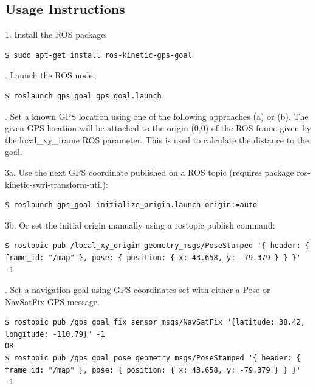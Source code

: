 \documentclass[runningheads,a4paper]{llncs}
\begin{document}
\subsection{Usage Instructions}

1. Install the ROS package:

\begin{lstlisting}[frame=single,basicstyle=\ttfamily\footnotesize,breaklines=true]
$ sudo apt-get install ros-kinetic-gps-goal
\end{lstlisting}

. Launch the ROS node:

\begin{lstlisting}[frame=single,basicstyle=\ttfamily\footnotesize,breaklines=true]
$ roslaunch gps_goal gps_goal.launch
\end{lstlisting}


. Set a known GPS location using one of the following approaches (a) or (b). The given GPS location will be attached to the origin (0,0) of the ROS frame given by the local\_xy\_frame ROS parameter. This is used to calculate the distance to the goal.

3a. Use the next GPS coordinate published on a ROS topic (requires package ros-kinetic-swri-transform-util):

\begin{lstlisting}[frame=single,basicstyle=\ttfamily\footnotesize,breaklines=true]
$ roslaunch gps_goal initialize_origin.launch origin:=auto
\end{lstlisting}

3b. Or set the initial origin manually using a rostopic publish command:
\begin{lstlisting}[frame=single,basicstyle=\ttfamily\footnotesize,breaklines=true]
$ rostopic pub /local_xy_origin geometry_msgs/PoseStamped '{ header: { frame_id: "/map" }, pose: { position: { x: 43.658, y: -79.379 } } }' -1
\end{lstlisting}

. Set a navigation goal using GPS coordinates set with either a Pose or NavSatFix GPS message.

\begin{lstlisting}[frame=single,basicstyle=\ttfamily\footnotesize,breaklines=true]
$ rostopic pub /gps_goal_fix sensor_msgs/NavSatFix "{latitude: 38.42, longitude: -110.79}" -1
OR
$ rostopic pub /gps_goal_pose geometry_msgs/PoseStamped '{ header: { frame_id: "/map" }, pose: { position: { x: 43.658, y: -79.379 } } }' -1
\end{lstlisting}
\end{document}
